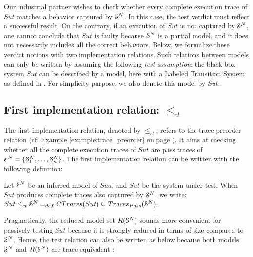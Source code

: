 Our industrial partner wishes to check whether every complete
execution trace of $\mathit{Sut}$ matches a behavior captured by
$\EuScript{S}^{N}$. In this case, the test verdict must reflect a
successful result. On the contrary, if an execution of
$\mathit{Sut}$ is not captured by $\EuScript{S}^{N}$, one cannot
conclude that $\mathit{Sut}$ is faulty because $\EuScript{S}^{N}$
is a partial model, and it does not necessarily includes all the
correct behaviors. Below, we formalize these verdict notions
with two implementation relations. Such relations between models
can only be written by assuming the following \emph{test
assumption}: the black-box system $\mathit{Sut}$ can be described
by a model, here with a Labeled Transition System as defined in
. For
simplicity purpose, we also denote this model by $\mathit{Sut}$.

\subsection{First implementation relation: $\leq_{ct}$}

The first implementation relation, denoted by $\leq_{ct}$, refers
to the trace preorder relation
\cite{DNH84,vaandrager1991relationship} (cf. Example
\ref{example:trace_preorder} on page
\pageref{example:trace_preorder}).
It aims at checking whether all the complete execution traces of
$\mathit{Sut}$ are pass traces of
$\EuScript{S}^{N}=\{\EuScript{S}_1^{N},\dots,\EuScript{S}_n^{N}\}$.
The first implementation relation can be written with the
following definition:

\begin{definition}
\label{rel:impl1}

Let $\EuScript{S}^{N}$ be an inferred model of $\mathit{Sua}$, and
$\mathit{Sut}$ be the system under test. When $\mathit{Sut}$
produces complete traces also captured by $\EuScript{S}^{N}$, we
write: ${Sut} \leq_{ct} \EuScript{S}^{N} =_{def} CTraces({Sut})
\subseteq  Traces_{Pass}(\EuScript{S}^{N})$.
\end{definition}

Pragmatically, the reduced model set $R(\EuScript{S}^{N})$ sounds
more convenient for passively testing $\mathit{Sut}$ because it
is strongly reduced in terms of size compared to
$\EuScript{S}^{N}$. Hence, the test relation can also be written
as below because both models $\EuScript{S}^{N}$ and
$R(\EuScript{S}^{N})$ are trace equivalent \cite{petrenko06}:


